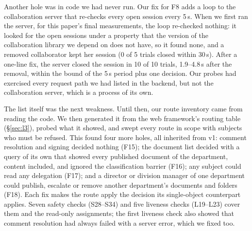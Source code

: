 Another hole was in code we had never run. Our fix for F8 adds a loop to the collaboration server that
re-checks every open session every 5\,s. When we first ran the server, for this paper's final measurements, the
loop re-checked nothing: it looked for the open sessions under a property that the version of the
collaboration library we depend on does not have, so it found none, and a removed collaborator kept her session
(0 of 5 trials closed within 30\,s). After a one-line fix, the server closed the session in 10 of 10 trials,
1.9--4.8\,s after the removal, within the bound of the 5\,s period plus one decision. Our probes had exercised
every request path we had listed in the backend, but not the collaboration server, which is a process of its own.

The list itself was the next weakness. Until then, our route inventory came from reading the code. We then
generated it from the web framework's routing table (\S\ref{sec:l3}), probed what it showed, and swept every
route in scope with subjects who must be refused. This found four more holes, all inherited from v1: comment
resolution and signing decided nothing (F15); the document list decided with a query of its own that showed
every published document of the department, content included, and ignored the classification barrier (F16);
any subject could read any delegation (F17); and a director or division manager of one department could
publish, escalate or remove another department's documents and folders (F18). Each fix makes the route apply
the decision its single-object counterpart applies. Seven safety checks (S28--S34) and five liveness checks
(L19--L23) cover them and the read-only assignments; the first liveness check also showed that comment
resolution had always failed with a server error, which we fixed too.

